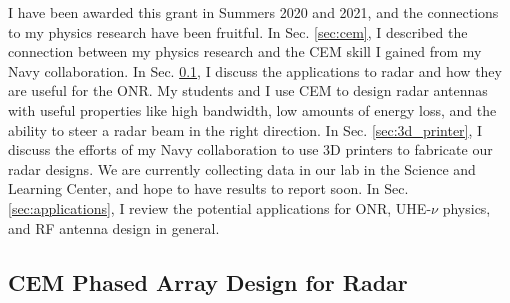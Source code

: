 \documentclass[../../../main.tex]{subfiles}
\begin{document}
I have been awarded this grant in Summers 2020 and 2021, and the connections to my physics research have been fruitful.  In Sec. \ref{sec:cem}, I described the connection between my physics research and the CEM skill I gained from my Navy collaboration.  In Sec. \ref{sec:phased_array}, I discuss the applications to radar and how they are useful for the ONR.  My students and I use CEM to design radar antennas with useful properties like high bandwidth, low amounts of energy loss, and the ability to steer a radar beam in the right direction.  In Sec. \ref{sec:3d_printer}, I discuss the efforts of my Navy collaboration to use 3D printers to fabricate our radar designs.  We are currently collecting data in our lab in the Science and Learning Center, and hope to have results to report soon.  In Sec. \ref{sec:applications}, I review the potential applications for ONR, UHE-$\nu$ physics, and RF antenna design in general.

\subsection{CEM Phased Array Design for Radar}
\label{sec:phased_array}
\end{document}
